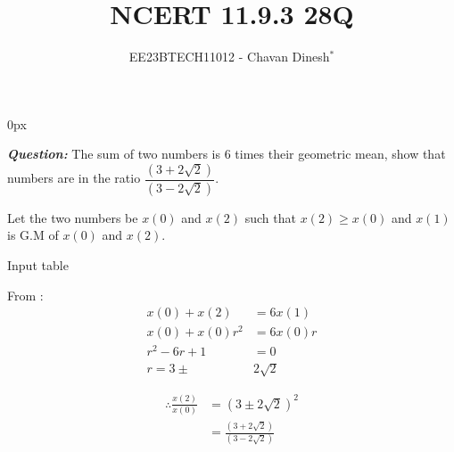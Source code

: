 \documentclass[journal,12pt,twocolumn]{IEEEtran}
\theoremstyle{remark}
\begin{document}
\parindent 0px

\vspace{3cm}

\title{NCERT 11.9.3 28Q}
\author{EE23BTECH11012 - Chavan Dinesh$^{*}$%
}
\maketitle
\newpage
\bigskip

\renewcommand{\thefigure}{\arabic{figure}}
\renewcommand{\thetable}{\arabic{table}}
\large\textbf{\textsl{Question:}}
The sum of two numbers is $6$ times their geometric mean, show that numbers are in the ratio $\dfrac{(3+2\sqrt{2})}{(3-2\sqrt{2})}$.

\solution
Let the two numbers be $x(0)$ and $x(2)$ such that $x(2)\geq x(0)$ and $x(1)$ is G.M of $x(0)$ and $x(2)$.
\begin{table}[htbp]
    \centering
    
    \caption{Input table}
    \label{tab:parameter_table.11.9.3.28}
\end{table}

From :
\begin{align}
x(0) + x(2) &= 6x(1) \\
x(0) + x(0)r^2 &= 6x(0)r \\
r^2 - 6r +1 &= 0 \\
r = 3\pm &2\sqrt{2}
\end{align}

\begin{align}
    \therefore \frac{x(2)}{x(0)} &= (3\pm2\sqrt{2})^2 \\
    &=  \frac{(3+2\sqrt{2})}{(3-2\sqrt{2})}
\end{align}


\end{document}

